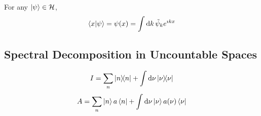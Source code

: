 \documentclass[a4paper,twoside,master.tex]{subfiles}
\begin{document}
For any $ \ket{\psi} \in \mathcal{H} $,
\begin{equation}
    \bra{x} \ket{\psi} = \psi(x) = \int \dd{k} \tilde{\psi}_k e^{\imath k x}
\end{equation}

\subsection{Spectral Decomposition in Uncountable Spaces}
\label{sub:spectral_decomposition_in_uncountable_spaces}

\begin{equation}
    I = \sum_n \op{n} + \int \dd{\nu} \op{\nu}
\end{equation}
\begin{equation}
    A = \sum_n \ket{n} a \bra{n} + \int \dd{\nu} \ket{\nu} a(\nu) \bra{\nu}
\end{equation}
\end{document}
